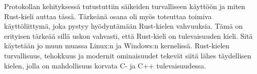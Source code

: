 \documentclass[a4paper,12pt]{article}
\begin{document}
    Protokollan kehityksessä tutustuttiin säikeiden turvalliseen käyttöön ja miten Rust-kieli auttaa tässä. Tärkeänä osana oli myös toteuttaa toimiva käyttöliittymä, joka pystyy hyödyntämään Rust-kielen vahvuuksia. Tämä on erityisen tärkeää sillä
    uskon vahvasti, että Rust-kieli on tulevaisuuden kieli. Sitä käytetään jo muun muassa Linux:n ja Windows:n kernelissä. Rust-kielen turvallisuus, tehokkuus ja modernit ominaisuudet tekevät siitä lähes täydellisen kielen, jolla on mahdollisuus korvata C- ja C++ tulevaisuudessa.


    \newpage
    \printbibliography
\end{document}

